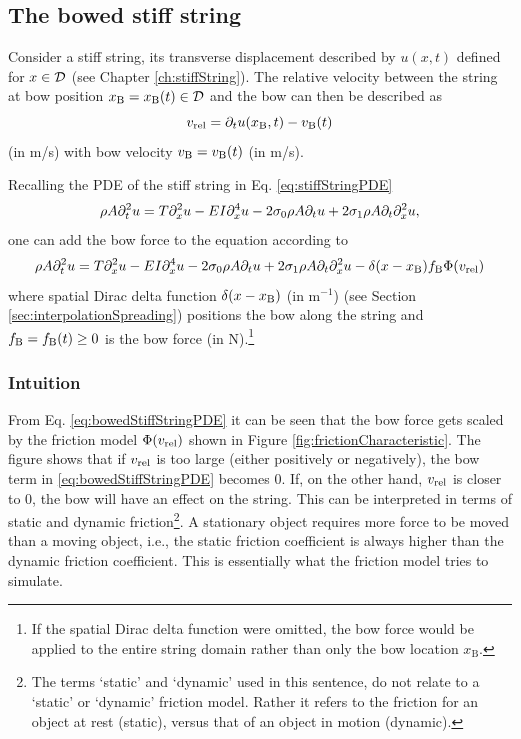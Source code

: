 \subsection{The bowed stiff string}\label{sec:bowedStiffStringStatic}
Consider a stiff string, its transverse displacement described by $u(x,t)$ defined for $x\in \mathcal{D}$ (see Chapter \ref{ch:stiffString}). The relative velocity between the string at bow position $x_{\text{B}} = x_{\text{B}}(t) \in \mathcal{D}$ and the bow can then be described as
\begin{equation}\label{eq:vrel}
    v_\text{rel} = \partial_t u(x_{\text{B}}, t) - v_{\text{B}}(t)
\end{equation}
(in m/s) with bow velocity $v_{\text{B}} = v_{\text{B}}(t)$ (in m/s).

Recalling the PDE of the stiff string in Eq. \eqref{eq:stiffStringPDE}
\begin{equation}
    \rho A \partial_t^2 u = T \partial_x^2 u - EI \partial_x^4 u - 2 \sigma_{0} \rho A \partial_t u + 2 \sigma_{1} \rho A\partial_t \partial_x^2 u,
\end{equation}
one can add the bow force to the equation according to 
\begin{equation}\label{eq:bowedStiffStringPDE}
    \rho A \partial_t^2 u = T \partial_x^2 u - EI \partial_x^4 u - 2 \sigma_{0} \rho A \partial_t u + 2 \sigma_{1} \rho A\partial_t \partial_x^2 u - \delta(x-x_{\text{B}})f_{\text{B}}\Phi(v_\text{rel})
\end{equation}
where spatial Dirac delta function $\delta(x-x_{\text{B}})$ (in m$^{-1}$) (see Section \ref{sec:interpolationSpreading}) positions the bow along the string and $f_{\text{B}} = f_{\text{B}}(t) \geq 0$ is the bow force (in N).\footnote{If the spatial Dirac delta function were omitted, the bow force would be applied to the entire string domain rather than only the bow location $x_\text{B}$.} 

\subsubsection{Intuition}
From Eq. \eqref{eq:bowedStiffStringPDE} it can be seen that the bow force gets scaled by the friction model $\Phi(v_\text{rel})$ shown in Figure \ref{fig:frictionCharacteristic}. 
The figure shows that if $v_\text{rel}$ is too large (either positively or negatively), the bow term in \eqref{eq:bowedStiffStringPDE} becomes $0$. If, on the other hand, $v_\text{rel}$ is closer to $0$, the bow will have an effect on the string. This can be interpreted in terms of static and dynamic friction\footnote{The terms `static' and `dynamic' used in this sentence, do not relate to a `static' or `dynamic' friction model. Rather it refers to the friction for an object at rest (static), versus that of an object in motion (dynamic).}. A stationary object requires more force to be moved than a moving object, i.e., the static friction coefficient is always higher than the dynamic friction coefficient. This is essentially what the friction model tries to simulate.

